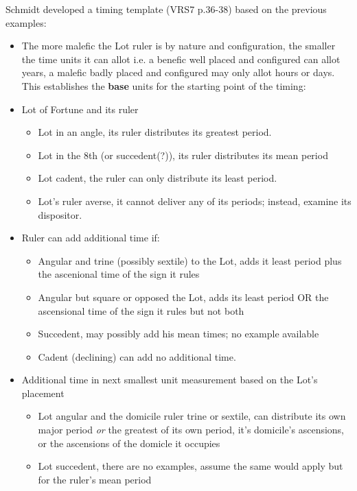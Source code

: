 \begin{mdframed}[backgroundcolor=cyan!05]
\tiny
Schmidt developed a timing template (VRS7 p.36-38) based on the previous examples:

\begin{itemize}[itemsep=1pt, topsep=1pt, partopsep=0pt]
\item The more malefic the Lot ruler is by nature and configuration, the smaller the time units it can allot i.e. a benefic well placed and configured can allot years, a malefic badly placed and configured may only allot hours or days. This establishes the \textbf{base} units for the starting point of the timing: 
\item Lot of Fortune  and its ruler
\begin{itemize}[itemsep=1pt, topsep=1pt, partopsep=0pt]
\item Lot in an angle, its ruler distributes its greatest period.
\item Lot in the 8th (or succedent(?)), its ruler distributes its mean period
\item Lot cadent, the ruler can only distribute its least period.
\item Lot's ruler averse, it cannot deliver any of its periods; instead, examine its dispositor.
\end{itemize}
\item Ruler can add additional time if:
\begin{itemize}[itemsep=1pt, topsep=1pt, partopsep=0pt]
\item Angular and trine (possibly sextile) to the Lot, adds it least period plus the ascenional time of the sign it rules
\item Angular but square or opposed the Lot, adds its least period OR the ascensional time of the sign it rules but not both
\item Succedent, may possibly add his mean times; no example available
\item Cadent (declining) can add no additional time.
\end{itemize}
\item Additional time in next smallest unit measurement based on the Lot's placement
\begin{itemize}[itemsep=1pt, topsep=1pt, partopsep=0pt]
\item Lot angular and the domicile ruler trine or sextile, can distribute its own major period \textsl{or} the greatest of its own period, it's domicile's ascensions, or the ascensions of the domicle it occupies
\item Lot succedent, there are no examples, assume the same would apply but for the ruler's mean period 

\end{itemize}
\end{itemize}
\end{mdframed}
